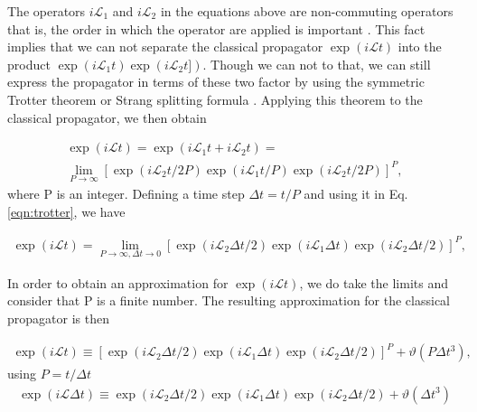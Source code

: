 The operators $i\mathcal{L}_{1}$ and $i\mathcal{L}_{2}$ in the equations above are non-commuting operators that is, the order in which the operator are applied is important \cite{tuckerman}. This fact implies that we can not separate the classical propagator $\exp (i\mathcal{L}t)$  into the product $\exp (i\mathcal{L}_{1}t) \exp (i\mathcal{L}_{2}t])$. Though we can not to that, we can still express the propagator in terms of these two factor by using the symmetric Trotter theorem or Strang splitting formula \cite{trotter,strang}. Applying this theorem to the classical propagator, we then obtain

\begin{equation}
\begin{aligned}
\exp (i\mathcal{L}t)  = \exp (i\mathcal{L}_{1}t + i\mathcal{L}_{2}t) = \\
\lim\limits_{P \rightarrow \infty} \left [ \exp (i\mathcal{L}_{2}t/2P) \exp (i\mathcal{L}_{1}t/P) \exp (i\mathcal{L}_{2}t/2P) \right ]^{P},
\end{aligned}
\label{eqn:trotter}
\end{equation}
where P is an integer. Defining a time step $\Delta t =t/P$ and using it in Eq. \ref{eqn:trotter}, we have

\begin{equation}
\begin{aligned}
\exp (i\mathcal{L}t)  = 
\lim\limits_{P \rightarrow \infty, \Delta t \rightarrow 0} \left [ \exp (i\mathcal{L}_{2} \Delta t/2) \exp (i\mathcal{L}_{1} \Delta t) \exp (i\mathcal{L}_{2} \Delta t/2) \right ]^{P},
\end{aligned}
\label{eqn:trotterdt}
\end{equation}

In order to obtain an approximation for $\exp (i\mathcal{L}t)$, we do take the limits and consider that P is a finite number. The resulting approximation for the classical propagator is then 

\begin{equation}
\begin{aligned}
\exp (i\mathcal{L}t)  \equiv
 \left [ \exp (i\mathcal{L}_{2} \Delta t/2) \exp (i\mathcal{L}_{1} \Delta t) \exp (i\mathcal{L}_{2} \Delta t/2) \right ]^{P} + \vartheta (P \Delta t^{3}),
\end{aligned}
\end{equation}
using $P= t/\Delta t$
\begin{equation}
\begin{aligned}
\exp (i\mathcal{L} \Delta t)  \equiv
 \exp (i\mathcal{L}_{2} \Delta t/2) \exp (i\mathcal{L}_{1} \Delta t) \exp (i\mathcal{L}_{2} \Delta t/2)  + \vartheta (\Delta t^{3})
\end{aligned}
\label{eqn:trotterfin}
\end{equation}  

